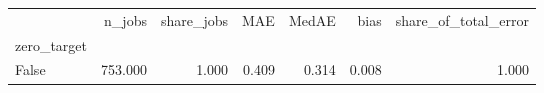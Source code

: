 \begin{tabular}{lrrrrrr}
\toprule
 & n_jobs & share_jobs & MAE & MedAE & bias & share_of_total_error \\
zero_target &  &  &  &  &  &  \\
\midrule
False & 753.000 & 1.000 & 0.409 & 0.314 & 0.008 & 1.000 \\
\bottomrule
\end{tabular}
